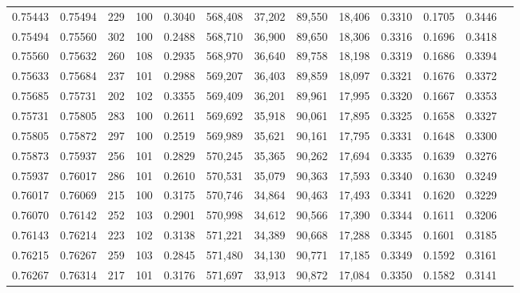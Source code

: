 \begin{tabular}{rrrrrrrrrrrrr}
0.75443 & 0.75494 &   229 & 100 &                                     0.3040 & 568,408 &  37,202 &  89,550 &  18,406 & 0.3310 & 0.1705 & 0.3446 \\
0.75494 & 0.75560 &   302 & 100 &                                     0.2488 & 568,710 &  36,900 &  89,650 &  18,306 & 0.3316 & 0.1696 & 0.3418 \\
0.75560 & 0.75632 &   260 & 108 &                                     0.2935 & 568,970 &  36,640 &  89,758 &  18,198 & 0.3319 & 0.1686 & 0.3394 \\
0.75633 & 0.75684 &   237 & 101 &                                     0.2988 & 569,207 &  36,403 &  89,859 &  18,097 & 0.3321 & 0.1676 & 0.3372 \\
0.75685 & 0.75731 &   202 & 102 &                                     0.3355 & 569,409 &  36,201 &  89,961 &  17,995 & 0.3320 & 0.1667 & 0.3353 \\
0.75731 & 0.75805 &   283 & 100 &                                     0.2611 & 569,692 &  35,918 &  90,061 &  17,895 & 0.3325 & 0.1658 & 0.3327 \\
0.75805 & 0.75872 &   297 & 100 &                                     0.2519 & 569,989 &  35,621 &  90,161 &  17,795 & 0.3331 & 0.1648 & 0.3300 \\
0.75873 & 0.75937 &   256 & 101 &                                     0.2829 & 570,245 &  35,365 &  90,262 &  17,694 & 0.3335 & 0.1639 & 0.3276 \\
0.75937 & 0.76017 &   286 & 101 &                                     0.2610 & 570,531 &  35,079 &  90,363 &  17,593 & 0.3340 & 0.1630 & 0.3249 \\
0.76017 & 0.76069 &   215 & 100 &                                     0.3175 & 570,746 &  34,864 &  90,463 &  17,493 & 0.3341 & 0.1620 & 0.3229 \\
0.76070 & 0.76142 &   252 & 103 &                                     0.2901 & 570,998 &  34,612 &  90,566 &  17,390 & 0.3344 & 0.1611 & 0.3206 \\
0.76143 & 0.76214 &   223 & 102 &                                     0.3138 & 571,221 &  34,389 &  90,668 &  17,288 & 0.3345 & 0.1601 & 0.3185 \\
0.76215 & 0.76267 &   259 & 103 &                                     0.2845 & 571,480 &  34,130 &  90,771 &  17,185 & 0.3349 & 0.1592 & 0.3161 \\
0.76267 & 0.76314 &   217 & 101 &                                     0.3176 & 571,697 &  33,913 &  90,872 &  17,084 & 0.3350 & 0.1582 & 0.3141 \\

\end{tabular}
